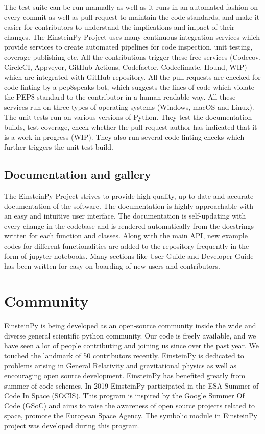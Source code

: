 \documentclass[onecolumn]{aa}
\begin{document}
The test suite can be run manually as well as it runs in an automated fashion on every commit as well as pull request to maintain the code standards, and make it easier for contributors to understand the implications and impact of their changes. The EinsteinPy Project uses many continuous-integration services which provide services to create automated pipelines for code inspection, unit testing, coverage publishing etc. All the contributions trigger these free services (Codecov, CircleCI, Appveyor, GitHub Actions, Codefactor, Codeclimate, Hound, WIP) which are integrated with GitHub repository. All the pull requests are checked for code linting by a pep8speaks bot, which suggests the lines of code which violate the PEP8 standard to the contributor in a human-readable way. All these services run on three types of operating systems (Windows, macOS and Linux). The unit tests run on various versions of Python. They test the documentation builds, test coverage, check whether the pull request author has indicated that it is a work in progress (WIP). They also run several code linting checks which further triggers the unit test build.


\subsection{ Documentation and gallery} \label{subsec:doc}
The EinsteinPy Project strives to provide high quality, up-to-date and accurate documentation of the software. The documentation is highly approachable with an easy and intuitive user interface. The documentation is self-updating with every change in the codebase and is rendered automatically from the docstrings written for each function and classes. Along with the main API, new example codes for different functionalities are added to the repository frequently in the form of jupyter notebooks. Many sections like User Guide and Developer Guide has been written for easy on-boarding of new users and contributors.
	
\section{Community} \label{sec:COMMUNITY}
EinsteinPy is being developed as an open-source community inside the wide and diverse general scientific python community. Our code is freely available, and we have seen a lot of people contributing and joining us since over the past year. We touched the landmark of 50 contributors recently. EinsteinPy is dedicated to problems arising in General Relativity and gravitational physics as well as encouraging open source development. EinsteinPy has benefited greatly from summer of code schemes. In 2019 EinsteinPy participated in the ESA Summer of Code In Space (SOCIS). This program is inspired by the Google Summer Of Code (GSoC) and aims to raise the awareness of open source projects related to space, promote the European Space Agency. The symbolic module in EinsteinPy project was developed during this program.
\end{document}
